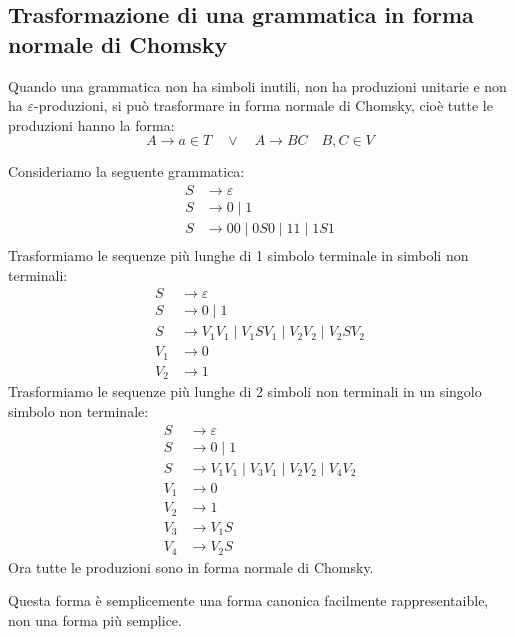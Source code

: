 \documentclass[a4paper]{article}
\begin{document}
\subsection{Trasformazione di una grammatica in forma normale di Chomsky}
Quando una grammatica non ha simboli inutili, non ha produzioni unitarie e
non ha \( \varepsilon \)-produzioni, si può trasformare in forma normale di
Chomsky, cioè tutte le produzioni hanno la forma:
\[
  A \to a \in T \quad \vee \quad A \to BC \quad B, C \in V
\] 
\begin{example}
  Consideriamo la seguente grammatica:
  \[
  \begin{aligned}
    S &\to \varepsilon  \\ 
    S &\to 0 \;|\; 1 \\
    S &\to 00 \;|\; 0S0 \;|\; 11 \;|\; 1S1\\
  \end{aligned}
  \] 
  Trasformiamo le sequenze più lunghe di 1 simbolo terminale in simboli non terminali:
  \[
  \begin{aligned}
    S &\to \varepsilon  \\ 
    S &\to 0 \;|\; 1 \\
    S &\to V_1V_1 \;|\; V_1 S V_1 \;|\; V_2 V_2 \;|\; V_2 S V_2\\
    V_1 &\to 0\\
    V_2 &\to 1
  \end{aligned}
  \] 
  Trasformiamo le sequenze più lunghe di 2 simboli non terminali in un singolo simbolo
  non terminale:
  \[
  \begin{aligned}
    S &\to \varepsilon  \\ 
    S &\to 0 \;|\; 1 \\
    S &\to V_1V_1 \;|\; V_3 V_1 \;|\; V_2 V_2 \;|\; V_4 V_2\\
    V_1 &\to 0\\
    V_2 &\to 1\\
    V_3 &\to V_1 S\\
    V_4 &\to V_2 S
  \end{aligned}
  \] 
  Ora tutte le produzioni sono in forma normale di Chomsky.
\end{example}
Questa forma è semplicemente una forma canonica facilmente rappresentaible,
non una forma più semplice.
\end{document}
